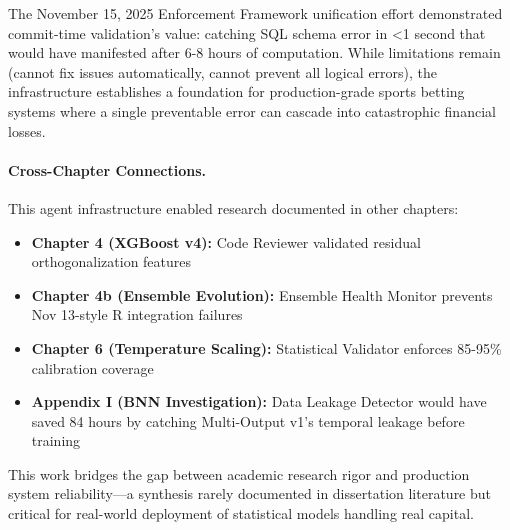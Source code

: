 The November 15, 2025 Enforcement Framework unification effort demonstrated commit-time validation's value: catching SQL schema error in <1 second that would have manifested after 6-8 hours of computation. While limitations remain (cannot fix issues automatically, cannot prevent all logical errors), the infrastructure establishes a foundation for production-grade sports betting systems where a single preventable error can cascade into catastrophic financial losses.

\paragraph{Cross-Chapter Connections.}
This agent infrastructure enabled research documented in other chapters:

\begin{itemize}[itemsep=2pt,parsep=0pt]
    \item \textbf{Chapter 4 (XGBoost v4):} Code Reviewer validated residual orthogonalization features
    \item \textbf{Chapter 4b (Ensemble Evolution):} Ensemble Health Monitor prevents Nov 13-style R integration failures
    \item \textbf{Chapter 6 (Temperature Scaling):} Statistical Validator enforces 85-95\% calibration coverage
    \item \textbf{Appendix I (BNN Investigation):} Data Leakage Detector would have saved 84 hours by catching Multi-Output v1's temporal leakage before training
\end{itemize}

This work bridges the gap between academic research rigor and production system reliability---a synthesis rarely documented in dissertation literature but critical for real-world deployment of statistical models handling real capital.


